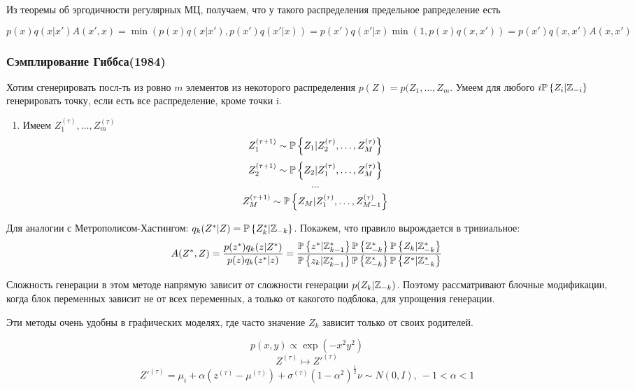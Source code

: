 Из теоремы об эргодичности регулярных МЦ, получаем, что у такого распределения предельное рапределение есть

$$ p(x) q(x|x')A(x',x) = \min(p(x)q(x|x'), p(x')q(x'|x)) = p(x')q(x'|x) \min(1, p(x)q(x,x')) = p(x')q(x,x')A(x,x') $$


\subsubsection*{Сэмплирование Гиббса(1984)}
Хотим сгенерировать посл-ть из ровно $m$ элементов из некоторого распределения $p(Z) = p(Z_1, \ldots, Z_m$. Умеем для любого $i \mathbb{P}\left\{ Z_i|\mathbb{Z}_{-i} \right\}$ генерировать точку, если есть все распределение, кроме точки i.
\begin{enumerate}
	\item Имеем $Z_1^{(\tau)}, \ldots, Z_m^{(\tau)}$
			$$ Z_1^{(\tau+1)} \sim \mathbb{P}\left\{ Z_1|Z_2^{(\tau)}, \ldots, Z_M^{(\tau)} \right\} $$
			$$ Z_2^{(\tau+1)} \sim \mathbb{P}\left\{ Z_2|Z_1^{(\tau)}, \ldots, Z_M^{(\tau)} \right\} $$
			$$ \ldots $$
			$$ Z_M^{(\tau+1)} \sim \mathbb{P}\left\{ Z_M|Z_1^{(\tau)}, \ldots, Z_{M-1}^{(\tau)} \right\} $$
\end{enumerate}
 Для аналогии с Метрополисом-Хастингом: $q_k(Z^*|Z) = \mathbb{P}\left\{ Z_k^*|\mathbb{Z}_{-k} \right\}$. Покажем, что правило вырождается в тривиальное: 
 $$ A(Z^*, Z) = \frac{p(z^*)q_k(z|Z^*)}{p(z)q_k(z^*|z)} = \frac{ \mathbb{P}\left\{ z^*|\mathbb{Z}_{k-1}^* \right\}\mathbb{P}\left\{ \mathbb{Z}_{-k}^* \right\} \mathbb{P}\left\{ Z_k|\mathbb{Z}_{-k}^* \right\} }{  \mathbb{P}\left\{ z_k|\mathbb{Z}_{k-1}^* \right\}\mathbb{P}\left\{ \mathbb{Z}_{-k}^* \right\} \mathbb{P}\left\{ Z^*|\mathbb{Z}_{-k}^* \right\}  } $$

\begin{remark}
Сложность генерации в этом методе напрямую зависит от сложности генерации $p(Z_k|\mathbb{Z}_{-k})$. Поэтому рассматривают блочные модификации, когда блок переменных зависит не от всех переменных, а только от какогото подблока, для упрощения генерации.
\end{remark}

\begin{remark}
	Эти методы очень удобны в графических моделях, где часто значение $Z_k$ зависит только от своих родителей.
\end{remark}

\begin{remark}
	$$ p(x,y) \propto \exp (-x^2y^2) $$
	$$ Z^{(\tau)} \mapsto Z'^{(\tau)} $$
	$$ Z'^{(\tau)} = \mu_i + \alpha(z^{(\tau)} - \mu^{(\tau)}) + \sigma^{(\tau)}(1-\alpha^2)^{\frac{1}{2}} \nu \sim N(0,I), \ -1<\alpha<1  $$
\end{remark}